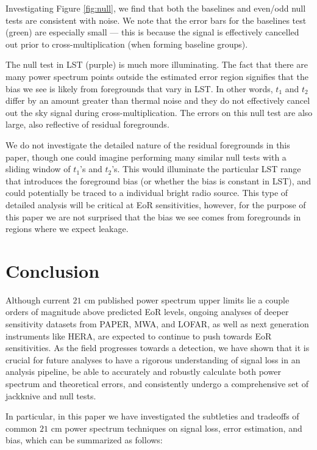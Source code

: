 \documentclass[preprint2,numberedappendix,tighten]{aastex6}  %
\begin{document}
Investigating Figure \ref{fig:null}, we find that both the baselines and even/odd null tests are consistent with noise. We note that the error bars for the baselines test (green) are especially small --- this is because the signal is effectively cancelled out prior to cross-multiplication (when forming baseline groups). 

The null test in LST (purple) is much more illuminating. The fact that there are many power spectrum points outside the estimated error region signifies that the bias we see is likely from foregrounds that vary in LST. In other words, $t_{1}$ and $t_{2}$ differ by an amount greater than thermal noise and they do not effectively cancel out the sky signal during cross-multiplication. The errors on this null test are also large, also reflective of residual foregrounds. 

We do not investigate the detailed nature of the residual foregrounds in this paper, though one could imagine performing many similar null tests with a sliding window of $t_{1}$'s and $t_{2}$'s. This would illuminate the particular LST range that introduces the foreground bias (or whether the bias is constant in LST), and could potentially be traced to a individual bright radio source. This type of detailed analysis will be critical at EoR sensitivities, however, for the purpose of this paper we are not surprised that the bias we see comes from foregrounds in regions where we expect leakage.


\section{Conclusion}
\label{sec:Con}

Although current $21$ cm published power spectrum upper limits lie a couple orders of magnitude above predicted EoR levels, ongoing analyses of deeper sensitivity datasets from PAPER, MWA, and LOFAR, as well as next generation instruments like HERA, are expected to continue to push towards EoR sensitivities. As the field progresses towards a detection, we have shown that it is crucial for future analyses to have a rigorous understanding of signal loss in an analysis pipeline, be able to accurately and robustly calculate both power spectrum and theoretical errors, and consistently undergo a comprehensive set of jackknive and null tests.

In particular, in this paper we have investigated the subtleties and tradeoffs of common $21$ cm power spectrum techniques on signal loss, error estimation, and bias, which can be summarized as follows:
\end{document}
